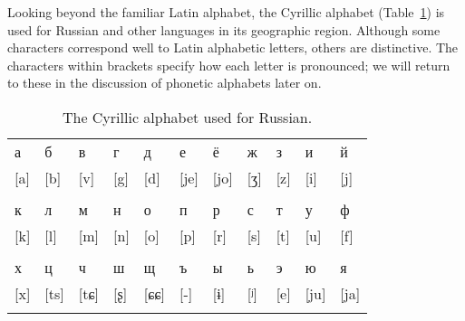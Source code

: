 



Looking beyond the familiar Latin alphabet, the Cyrillic alphabet (Table~\ref{fig:russian}) is  used for Russian and other  languages in its geographic region.  Although some characters
correspond well to Latin alphabetic letters, others are distinctive.  The characters within brackets specify how each
letter is  pronounced; we will return to these in the
discussion of phonetic alphabets later on.


    



\begin{table}
\begin{tabular}{lllllllllll}
  \lsptoprule
  а & б & в & г & д & е & ё & ж & з & и & й \\
  {[a]} & {[b]} & {[v]} & {[g]} & {[d]} & {[je]} & {[jo]} & [ʒ] & {[z]} & {[i]} & {[j]}\\
  & & & & & & & & & & \\
  \hline
  к & л & м & н & о & п & р & с & т & у & ф \\
  {[k]} & {[l]} & {[m]} & {[n]} & {[o]} & {[p]} & {[r]} & {[s]} & {[t]} & {[u]} & {[f]}\\
  & & & & & & & & & & \\
  \hline
  х & ц & ч & ш & щ & ъ & ы & ь & э & ю & я \\
  {[x]} & {[ts]} & [tɕ] & [ʂ] & [ɕɕ] & {[-]} & [ɨ] & [ʲ] & {[e]} & {[ju]} & {[ja]}\\
  \lspbottomrule
\end{tabular}
\caption{The Cyrillic alphabet used for Russian.}
\label{fig:russian}
\end{table}

